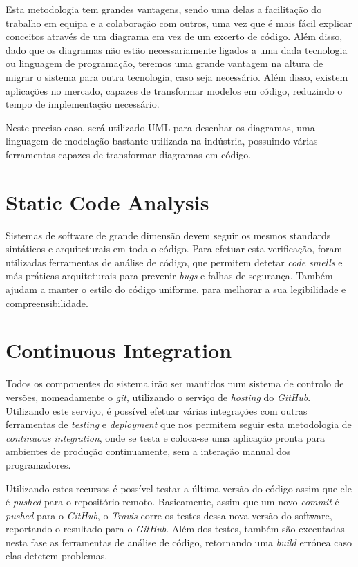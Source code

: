 Esta metodologia tem grandes vantagens, sendo uma delas a facilitação do trabalho em equipa e a colaboração com outros, uma vez que é mais fácil explicar conceitos através de um diagrama em vez de um excerto de código. Além disso, dado que os diagramas não estão necessariamente ligados a uma dada tecnologia ou linguagem de programação, teremos uma grande vantagem na altura de migrar o sistema para outra tecnologia, caso seja necessário. Além disso, existem aplicações no mercado, capazes de transformar modelos em código, reduzindo o tempo de implementação necessário.

Neste preciso caso, será utilizado UML para desenhar os diagramas, uma linguagem de modelação bastante utilizada na indústria, possuindo várias ferramentas capazes de transformar diagramas em código.

\section{Static Code Analysis}

Sistemas de software de  grande dimensão devem seguir os mesmos standards sintáticos e arquiteturais em toda o código. Para efetuar esta verificação, foram utilizadas ferramentas de análise de código, que permitem detetar \textit{code smells} e más práticas arquiteturais para prevenir \textit{bugs} e falhas de segurança. Também ajudam a manter o estilo do código uniforme, para melhorar a sua legibilidade e compreensibilidade.

\section{Continuous Integration}

Todos os componentes do sistema irão ser mantidos num sistema de controlo de versões, nomeadamente o \textit{git}, utilizando o serviço de \textit{hosting} do \textit{GitHub}. Utilizando este serviço, é possível efetuar várias integrações com outras ferramentas de \textit{testing} e \textit{deployment} que nos permitem seguir esta metodologia de \textit{continuous integration}, onde se testa e coloca-se uma aplicação pronta para ambientes de produção continuamente, sem a interação manual dos programadores.

Utilizando estes recursos é possível testar a última versão do código assim que ele é \textit{pushed} para o repositório remoto. Basicamente, assim que um novo \textit{commit} é \textit{pushed} para o \textit{GitHub}, o \textit{Travis} corre os testes dessa nova versão do software, reportando o resultado para o \textit{GitHub}. Além dos testes, também são executadas nesta fase as ferramentas de análise de código, retornando uma \textit{build} errónea caso elas detetem problemas.

